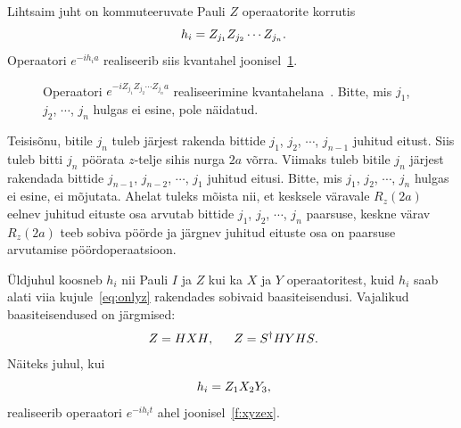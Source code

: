 \documentclass[12pt]{report}
\begin{document}
Lihtsaim juht on kommuteeruvate Pauli \(Z\) operaatorite korrutis
\begin{equation}\label{eq:onlyz}
  h_i = Z_{j_1}Z_{j_2}\cdots Z_{j_n} \rlap{.}
\end{equation}
Operaatori \(e^{-i h_i a}\) realiseerib siis kvantahel joonisel~\ref{f:expz}.
\begin{figure}[h]
  \centering
  \ifdefined\yquanton
  \fi
  \caption{Operaatori \(e^{-iZ_{j_1}Z_{j_2}\cdots Z_{j_n}a}\) realiseerimine kvantahelana~\cite{mansky+etal, nielsen+chuang}. Bitte, mis \(j_1\), \(j_2\), \(\cdots\), \(j_n\) hulgas ei esine, pole näidatud.}
  \label{f:expz}
\end{figure}
Teisisõnu, bitile \(j_n\) tuleb järjest rakenda bittide \(j_1\), \(j_2\), \(\cdots\), \(j_{n-1}\) juhitud eitust.
Siis tuleb bitti \(j_n\) pöörata \(z\)-telje sihis nurga \(2a\) võrra.
Viimaks tuleb bitile \(j_n\) järjest rakendada bittide \(j_{n-1}\), \(j_{n-2}\), \(\cdots\), \(j_1\) juhitud eitusi.
Bitte, mis \(j_1\), \(j_2\), \(\cdots\), \(j_n\) hulgas ei esine, ei mõjutata.
Ahelat tuleks mõista nii, et kesksele väravale \(R_z(2a)\) eelnev juhitud eituste osa arvutab bittide \(j_1\), \(j_2\), \(\cdots\), \(j_n\) paarsuse, keskne värav \(R_z(2a)\) teeb sobiva pöörde ja järgnev juhitud eituste osa on paarsuse arvutamise pöördoperaatsioon.

Üldjuhul koosneb \(h_i\) nii Pauli \(I\) ja \(Z\) kui ka \(X\) ja \(Y\) operaatoritest, kuid \(h_i\) saab alati viia kujule~\eqref{eq:onlyz} rakendades sobivaid baasiteisendusi.
Vajalikud baasiteisendused on järgmised:
\begin{align}
    Z = HXH \rlap{,}\qquad Z = S^\dagger HYHS \rlap{.}
\end{align}
Näiteks juhul, kui
\begin{equation}
  h_i = Z_1X_2Y_3 \rlap{,}
\end{equation}
realiseerib operaatori \(e^{-i h_i t}\) ahel joonisel~\ref{f:xyzex}.
\end{document}
